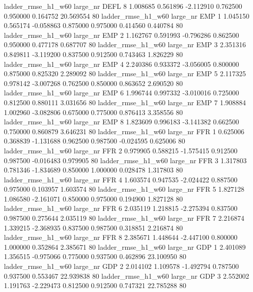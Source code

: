  ladder_rmse_h1_w60   large_nr     DEFL                 8  1.008685  0.561896  -2.112910 0.762500 0.950000  0.164752   20.569554 80
 ladder_rmse_h1_w60   large_nr      EMP                 1  1.045150  0.565174  -0.058863 0.875000 0.975000  0.414560    0.440784 80
 ladder_rmse_h1_w60   large_nr      EMP                 2  1.162767  0.591993  -0.796286 0.862500 0.950000  0.477178    0.687707 80
 ladder_rmse_h1_w60   large_nr      EMP                 3  2.351316  0.849811  -3.119200 0.837500 0.912500  0.743463    1.826229 80
 ladder_rmse_h1_w60   large_nr      EMP                 4  2.240386  0.933372  -3.056005 0.800000 0.875000  0.825320    2.289092 80
 ladder_rmse_h1_w60   large_nr      EMP                 5  2.117325  0.978142  -3.007268 0.762500 0.850000  0.863652    2.690520 80
 ladder_rmse_h1_w60   large_nr      EMP                 6  1.996744  0.997332  -3.010016 0.725000 0.812500  0.880111    3.031656 80
 ladder_rmse_h1_w60   large_nr      EMP                 7  1.908884  1.002960  -3.082806 0.675000 0.775000  0.876413    3.358556 80
 ladder_rmse_h1_w60   large_nr      EMP                 8  1.823609  0.996183  -3.141382 0.662500 0.750000  0.860879    3.646231 80
 ladder_rmse_h1_w60   large_nr      FFR                 1  0.625006  0.368839  -1.131688 0.962500 0.987500 -0.024595    0.625006 80
 ladder_rmse_h1_w60   large_nr      FFR                 2  0.979905  0.588215  -1.575415 0.912500 0.987500 -0.016483    0.979905 80
 ladder_rmse_h1_w60   large_nr      FFR                 3  1.317803  0.781346  -1.834689 0.850000 1.000000  0.028478    1.317803 80
 ladder_rmse_h1_w60   large_nr      FFR                 4  1.603574  0.947535  -2.024422 0.887500 0.975000  0.103957    1.603574 80
 ladder_rmse_h1_w60   large_nr      FFR                 5  1.827128  1.086580  -2.161071 0.850000 0.975000  0.194900    1.827128 80
 ladder_rmse_h1_w60   large_nr      FFR                 6  2.035119  1.218815  -2.275394 0.837500 0.987500  0.275644    2.035119 80
 ladder_rmse_h1_w60   large_nr      FFR                 7  2.216874  1.339215  -2.368935 0.837500 0.987500  0.318851    2.216874 80
 ladder_rmse_h1_w60   large_nr      FFR                 8  2.385671  1.448644  -2.447100 0.800000 1.000000  0.352864    2.385671 80
 ladder_rmse_h1_w60   large_nr      GDP                 1  2.401089  1.356515  -0.975066 0.775000 0.937500  0.462896   23.100950 80
 ladder_rmse_h1_w60   large_nr      GDP                 2  2.014102  1.109578  -1.492794 0.787500 0.937500  0.553467   22.939838 80
 ladder_rmse_h1_w60   large_nr      GDP                 3  2.552002  1.191763  -2.229473 0.812500 0.912500  0.747321   22.785288 80
